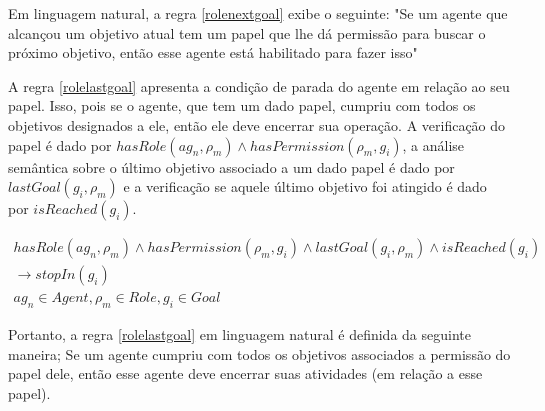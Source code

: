 Em linguagem natural, a regra \ref{rolenextgoal} exibe o seguinte: "Se um agente que alcançou um objetivo atual tem um papel que lhe dá permissão para buscar o próximo objetivo, então esse agente está habilitado para fazer isso"

A regra \ref{rolelastgoal} apresenta a condição de parada do agente em relação ao seu papel. Isso, pois se o agente, que tem um dado papel,
cumpriu com todos os objetivos designados a ele, então ele deve encerrar sua operação. A verificação do papel é dado por $hasRole(ag_n,\rho_m) \wedge hasPermission(\rho_m,g_i)$, a análise semântica sobre o último objetivo associado a um dado papel é dado por $lastGoal(g_i,\rho_m)$ e a verificação se aquele último objetivo foi atingido é dado por $isReached(g_i)$. 

\begin{eqnarray}\label{rolelastgoal}
	hasRole(ag_n,\rho_m) \wedge hasPermission(\rho_m,g_i) \wedge lastGoal(g_i,\rho_m) \wedge isReached(g_i) \nonumber \\
	\to stopIn(g_i) \nonumber \\
    ag_n \in Agent, \rho_m \in Role, g_i \in Goal
\end{eqnarray}

Portanto, a regra \ref{rolelastgoal} em linguagem natural é definida da seguinte maneira; Se um agente cumpriu com todos os objetivos associados a permissão do papel dele, então esse agente deve encerrar suas atividades (em relação a esse papel). 